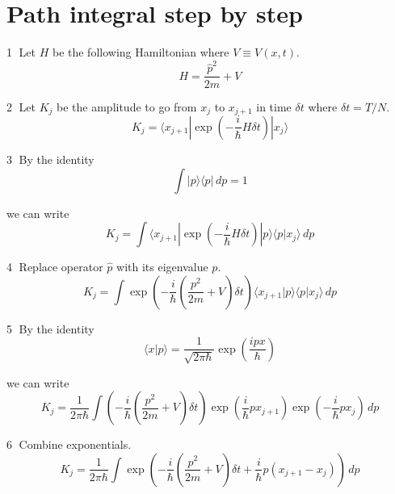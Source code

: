 \documentclass[12pt]{article}
\begin{document}
\section*{Path integral step by step}
\textcircled{\scriptsize1}
Let $H$ be the following Hamiltonian where $V\equiv V(x,t)$.
\begin{equation*}
H=\frac{\hat p^2}{2m}+V
\end{equation*}

\textcircled{\scriptsize2}
Let $K_j$ be the amplitude to go from $x_j$ to $x_{j+1}$
in time $\delta t$ where $\delta t=T/N$.
\begin{equation*}
K_j=\langle x_{j+1}|\exp\left(-\frac{i}{\hbar}H\delta t\right)|x_j\rangle
\end{equation*}

\textcircled{\scriptsize3}
By the identity
\begin{equation*}
\int|p\rangle\langle p|\,dp=1
\end{equation*}

we can write
\begin{equation*}
K_j=\int\langle x_{j+1}|\exp\left(-\frac{i}{\hbar}H\delta t\right)
|p\rangle\langle p|x_j\rangle\,dp
\end{equation*}

\textcircled{\scriptsize4}
Replace operator $\hat p$ with its eigenvalue $p$.
\begin{equation*}
K_j=\int
\exp\left(-\frac{i}{\hbar}\left(\frac{p^2}{2m}+V\right)\delta t\right)
\langle x_{j+1}|p\rangle\langle p|x_j\rangle\,dp
\end{equation*}

\textcircled{\scriptsize5}
By the identity
\begin{equation*}
\langle x|p\rangle=\frac{1}{\sqrt{2\pi\hbar}}\exp\left(\frac{ipx}{\hbar}\right)
\end{equation*}

we can write
\begin{equation*}
K_j=\frac{1}{2\pi\hbar}
\int
\left(-\frac{i}{\hbar}\left(\frac{p^2}{2m}+V\right)\delta t\right)
\exp\left(\frac{i}{\hbar}px_{j+1}\right)
\exp\left(-\frac{i}{\hbar}px_j\right)
\,dp
\end{equation*}

\textcircled{\scriptsize6}
Combine exponentials.
\begin{equation*}
K_j=\frac{1}{2\pi\hbar}
\int
\exp\left(-\frac{i}{\hbar}
\left(\frac{p^2}{2m}+V\right)
\delta t
+\frac{i}{\hbar}p(x_{j+1}-x_j)\right)
\,dp
\end{equation*}
\end{document}

